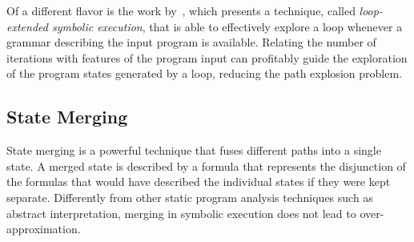 
Of a different flavor is the work by~\cite{SPM-ISSTA09}, which presents a technique, called {\em loop-extended symbolic execution}, that is able to effectively explore a loop whenever a grammar describing the input program is available. Relating the number of iterations with features of the program input can profitably guide the exploration of the program states generated by a loop, reducing the path explosion problem.




\subsection{State Merging}
State merging is a powerful technique that fuses different paths into a single state. A merged state is described by a formula that represents the disjunction of the formulas that would have described the individual states if they were kept separate. Differently from other static program analysis techniques such as abstract interpretation, merging in symbolic execution does not lead to over-approximation.


